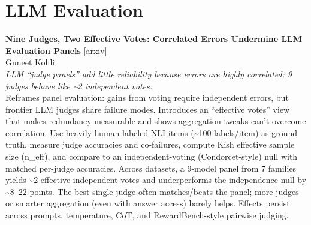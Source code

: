 \documentclass[12pt,letterpaper]{article}
\begin{document}
\medskip


\section*{LLM Evaluation}

{\small\textbf{Nine Judges, Two Effective Votes: Correlated Errors Undermine LLM Evaluation Panels}} {\scriptsize[\href{https://arxiv.org/abs/2605.29800}{arxiv}]}\\
{\scriptsize Guneet Kohli}\\

{\small\textit{LLM ``judge panels'' add little reliability because errors are highly correlated: 9 judges behave like \textasciitilde{}2 independent votes.}}\\[1pt]
{\footnotesize Reframes panel evaluation: gains from voting require independent errors, but frontier LLM judges share failure modes. Introduces an ``effective votes'' view that makes redundancy measurable and shows aggregation tweaks can't overcome correlation. Use heavily human-labeled NLI items (\textasciitilde{}100 labels/item) as ground truth, measure judge accuracies and co-failures, compute Kish effective sample size (n\_eff), and compare to an independent-voting (Condorcet-style) null with matched per-judge accuracies. Across datasets, a 9-model panel from 7 families yields \textasciitilde{}2 effective independent votes and underperforms the independence null by \textasciitilde{}8--22 points. The best single judge often matches/beats the panel; more judges or smarter aggregation (even with answer access) barely helps. Effects persist across prompts, temperature, CoT, and RewardBench-style pairwise judging.}

\medskip
\end{document}
